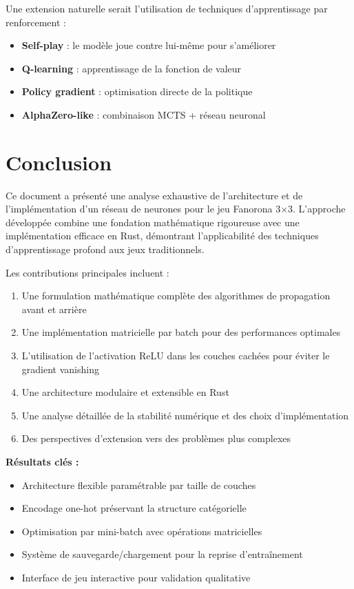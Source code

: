 \documentclass[12pt,a4paper]{report}
\numberwithin{equation}{section}
\begin{document}
Une extension naturelle serait l'utilisation de techniques d'apprentissage par renforcement :
\begin{itemize}
  \item \textbf{Self-play} : le modèle joue contre lui-même pour s'améliorer
  \item \textbf{Q-learning} : apprentissage de la fonction de valeur
  \item \textbf{Policy gradient} : optimisation directe de la politique
  \item \textbf{AlphaZero-like} : combinaison MCTS + réseau neuronal
\end{itemize}

\chapter{Conclusion}

Ce document a présenté une analyse exhaustive de l'architecture et de l'implémentation d'un réseau de neurones pour le jeu Fanorona 3×3. L'approche développée combine une fondation mathématique rigoureuse avec une implémentation efficace en Rust, démontrant l'applicabilité des techniques d'apprentissage profond aux jeux traditionnels.

Les contributions principales incluent :
\begin{enumerate}
  \item Une formulation mathématique complète des algorithmes de propagation avant et arrière
  \item Une implémentation matricielle par batch pour des performances optimales
  \item L'utilisation de l'activation ReLU dans les couches cachées pour éviter le gradient vanishing
  \item Une architecture modulaire et extensible en Rust
  \item Une analyse détaillée de la stabilité numérique et des choix d'implémentation
  \item Des perspectives d'extension vers des problèmes plus complexes
\end{enumerate}

\textbf{Résultats clés :}
\begin{itemize}
  \item Architecture flexible paramétrable par taille de couches
  \item Encodage one-hot préservant la structure catégorielle
  \item Optimisation par mini-batch avec opérations matricielles
  \item Système de sauvegarde/chargement pour la reprise d'entraînement
  \item Interface de jeu interactive pour validation qualitative
\end{itemize}
\end{document}
